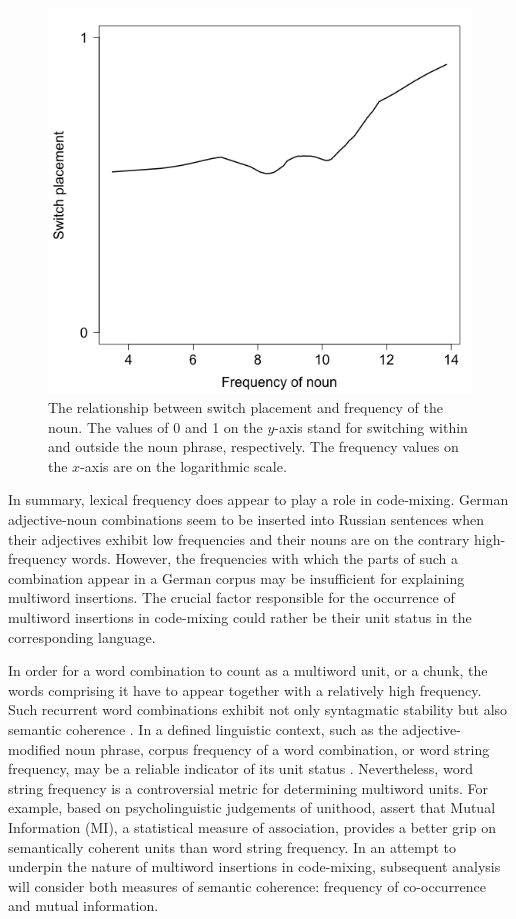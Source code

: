 \begin{figure}
    \includegraphics[scale=0.5]{figures/4-Fr_N.png}
	\caption{The relationship between switch placement and frequency of the noun. The values of 0 and 1 on the $y$-axis stand for switching within and outside the noun phrase, respectively. The frequency values on the $x$-axis are on the logarithmic scale.\label{fig:4:noun}}
\end{figure}

In summary, lexical frequency does appear to play a role in code-mixing. German adjective-noun combinations seem to be inserted into Russian sentences when their adjectives exhibit low frequencies and their nouns are on the contrary high-frequency words. However, the frequencies with which the parts of such a combination appear in a German corpus may be insufficient for explaining multiword insertions. The crucial factor responsible for the occurrence of multiword insertions in code-mixing could rather be their unit status in the corresponding language. 

In order for a word combination to count as a multiword unit, or a chunk, the words comprising it have to appear together with a relatively high frequency. Such recurrent word combinations exhibit not only syntagmatic stability but also semantic coherence \citep[cf.][136]{bybee-book-2010}. In a defined linguistic context, such as the adjective-modified noun phrase, corpus frequency of a word combination, or word string frequency, may be a reliable indicator of its unit status \citep[][]{heylen-2014}. Nevertheless, word string frequency is a controversial metric for determining multiword units. For example, based on psycholinguistic judgements of unithood, \citet{simpson.vlach&ellis2010} assert that Mutual Information (MI), a statistical measure of association, provides a better grip on semantically coherent units than word string frequency. In an attempt to underpin the nature of multiword insertions in code-mixing, subsequent analysis will consider both measures of semantic coherence:  frequency of co-occurrence and mutual information.  

